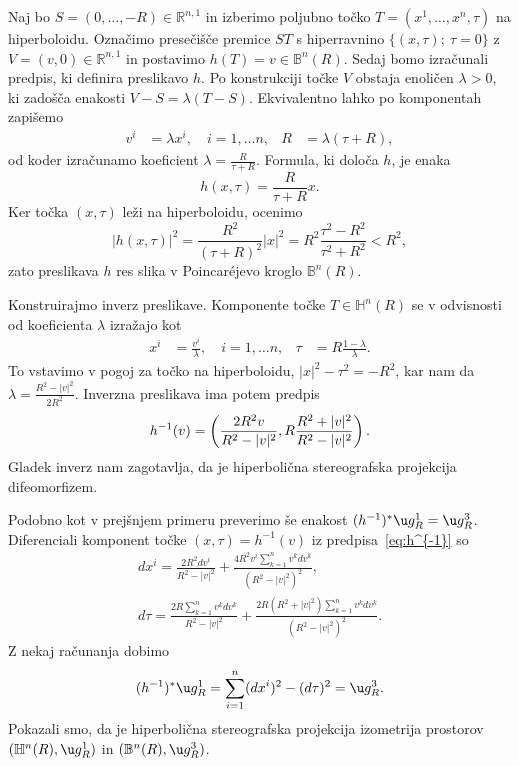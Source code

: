 \documentclass[a4paper]{article}
\begin{document}
Naj bo $S=(0, \dots , -R) \in \mathbb{R}^{n,1}$ in izberimo poljubno točko $T=(x^{1}, \dots , x^{n}, \tau)$ na hiperboloidu. Označimo presečišče premice $ST$ s hiperravnino $\{ (x, \tau); \ \tau=0 \}$ z $V=(v,0) \in \mathbb{R}^{n,1}$ in postavimo $h(T)=v \in \mathbb{B}^{n}(R)$.
Sedaj bomo izračunali predpis, ki definira preslikavo $h$.
Po konstrukciji točke $V$ obstaja enoličen $\lambda>0$, ki zadošča enakosti $V-S=\lambda(T-S)$. Ekvivalentno lahko po komponentah zapišemo
\begin{align*}
v^{i} &= \lambda x^{i}, \quad  i=1, \dots n, & R &= \lambda(\tau+R),
\end{align*}
od koder izračunamo koeficient $\lambda = \frac{R}{\tau+R}$. Formula, ki določa $h$, je enaka
\begin{equation}\label{eq: hip-ster-proj}
h(x,\tau) = \frac{R}{\tau+R}x.
\end{equation}
Ker točka $(x,\tau)$ leži na hiperboloidu, ocenimo
\[ |h(x,\tau)|^2 = \frac{R^2}{(\tau+R)^2} |x|^2 = R^2 \frac{\tau^2-R^2}{\tau^2+R^2} < R^2, \]
zato preslikava $h$ res slika v Poincar\'ejevo kroglo $\mathbb{B}^{n}(R)$.

Konstruirajmo inverz preslikave. Komponente točke $T \in \mathbb{H}^{n}(R)$ se v odvisnosti od koeficienta $\lambda$ izražajo kot
\begin{align*}
x^{i} &= \frac{v^{i}}{\lambda}, \quad  i=1, \dots n, & \tau &= R \frac{1-\lambda}{\lambda}.
\end{align*}
To vstavimo v pogoj za točko na hiperboloidu, $|x|^2-\tau^2=-R^2$, kar nam da $\lambda = \frac{R^2-|v|^2}{2R^2}$.
Inverzna preslikava ima potem predpis
\begin{equation}\label{eq:h^{-1}}
h^{-1}(v) = \left( \frac{2R^2v}{R^2-|v|^2}, R \frac{R^2+|v|^2}{R^2-|v|^2} \right).
\end{equation} 
Gladek inverz nam zagotavlja, da je hiperbolična stereografska projekcija difeomorfizem.

Podobno kot v prejšnjem primeru preverimo še enakost $(h^{-1})^{*} \u g_{R}^{1} = \u g_{R}^{3}$.
Diferenciali komponent točke $(x,\tau)=h^{-1}(v)$ iz predpisa~\ref{eq:h^{-1}} so
\begin{gather*}
dx^{i} = \frac{2R^2dv^{i}}{R^2-|v|^2} + \frac{4R^2v^{i} \sum_{k=1}^{n}v^{k}dv^{k}}{(R^2-|v|^2)^2}, \\
d\tau = \frac{2R \sum_{k=1}^{n}v^{k}dv^{k}}{R^2-|v|^2} + \frac{2R(R^2+|v|^2) \sum_{k=1}^{n}v^{k}dv^{k}}{(R^2-|v|^2)^2}.
\end{gather*}
Z nekaj računanja dobimo
\[ (h^{-1})^{*} \u g_{R}^{1} = \sum_{i=1}^{n} (dx^{i})^2 - (d\tau)^2 = \u g_{R}^{3}. \]
Pokazali smo, da je hiperbolična stereografska projekcija izometrija prostorov $(\mathbb{H}^{n}(R), \u g_{R}^{1})$ in $(\mathbb{B}^{n}(R), \u g_{R}^{3})$.
\end{document}
